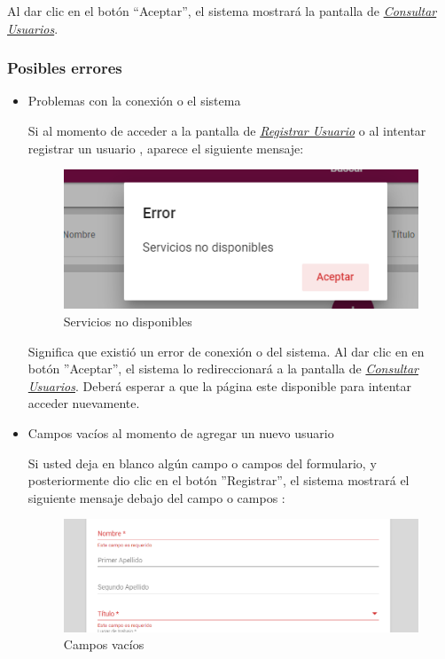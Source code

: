   Al dar clic en el botón “Aceptar”, el sistema mostrará la pantalla de  \hyperlink{consultarUs}{\textit{Consultar Usuarios}}.
  
  \subsubsection{Posibles errores}
  
  \begin{itemize}
  	\item Problemas con la conexión o el sistema
  	
  	Si al momento de acceder a la pantalla de \hyperlink{registrarUs}{\textit{Registrar Usuario}} o al intentar registrar un usuario , aparece el siguiente mensaje:
  	
  	\begin{figure}[!hbtp]
  		\centering
  		\includegraphics[width=0.4\linewidth]{images/SP5/MSGSN}
  		\caption{Servicios no disponibles}
  		\label{SND}
  		
  	\end{figure}
  	
  	Significa que existió un error de conexión o del sistema. Al dar clic en en botón ''Aceptar'', el sistema lo redireccionará a la pantalla de \hyperlink{consultarUs}{\textit{Consultar Usuarios}}. Deberá esperar a que la página este disponible para  intentar acceder nuevamente.
  	
  	\item Campos vacíos al momento de agregar un nuevo usuario
  	
  	Si usted deja en blanco algún campo o campos del formulario, y posteriormente dio clic en el botón ''Registrar'', el sistema mostrará el siguiente mensaje debajo del campo o campos :
  	
  	\begin{figure}[!hbtp]
  		\centering
  		\includegraphics[width=0.4\linewidth]{images/SP5/MSG44}
  		\caption{Campos vacíos}
  		\label{mensaje44}
  	\end{figure}
  	

\end{itemize}
